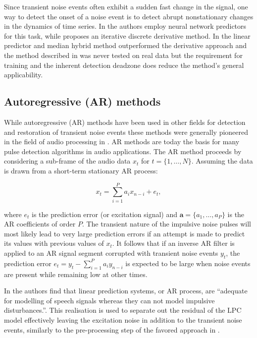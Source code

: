 Since transient noise events often exhibit a sudden fast change in the signal, one way to detect the onset of a noise event is to detect abrupt nonstationary changes in the dynamics of time series. In \cite{Fancourt2000} the authors employ neural network predictors for this task, while \cite{Kauppinen2002} proposes an iterative discrete derivative method. In \cite{Kauppinen2002} the linear predictor and median hybrid method outperformed the derivative approach and the method described in \cite{Fancourt2000} was never tested on real data but the requirement for training and the inherent detection deadzone does reduce the method's general applicability.

\subsection{Autoregressive (AR) methods}\label{sec:LitRevAR}
While autoregressive (AR) methods have been used in other fields for detection and restoration of transient noise events \cite{Arakawa1986} these methods were generally pioneered in the field of audio processing in \cite{Vaseghi1988thesis}\cite{Vaseghi1988}\cite{Vaseghi1990}. AR methods are today the basis for many pulse detection algorithms in audio applications\cite{Karjalainen1997}\cite{Esquef2000}\cite{Haermae2000}\cite{Esquef2002}\cite{Kauppinen2002}\cite{Wolfe2005}\cite{Subramanya2007}. The AR method proceeds by considering a sub-frame of the audio data $x_t$ for $ t = \{ 1, \ldots, N \}$. Assuming the data is drawn from a short-term stationary AR process:

\begin{equation}\label{eq:ARmodel}
x_t = \sum_{i=1}^P a_i x_{n-i} + e_t,
\end{equation}

where $e_t$ is the prediction error (or excitation signal) and $\mathbf{a} = \{a_1,\ldots,a_P\}$ is the AR coefficients of order $P$. The transient nature of the impulsive noise pulses will most likely lead to very large prediction errors if an attempt is made to predict its values with previous values of $x_t$. It follows that if an inverse AR filter is applied to an AR signal segment corrupted with transient noise events $y_t$, the prediction error $e_t = y_t - \sum_{i=1}^P a_i y_{n-i}$ is expected to be large when noise events are present while remaining low at other times\cite{Godsill1998book}.

In \cite{Vaseghi1990} the authors find that linear prediction systems, or AR process, are ``adequate for modelling of speech signals whereas they can not model impulsive disturbances.''. This realisation is used to separate out the residual of the LPC model effectively leaving the excitation noise in addition to the transient noise events, similarly to the pre-processing step of the favored approach in \cite{Kauppinen2002}.

